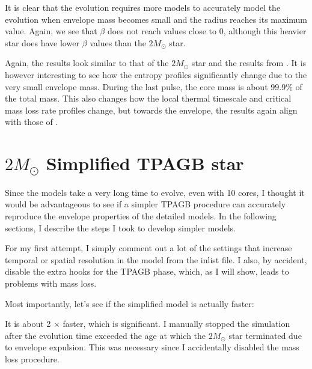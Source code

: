 \documentclass[a4paper,10pt]{article}
\begin{document}
\begin{figure}[ht]
    \centering
\end{figure}

It is clear that the evolution requires more models to accurately model the evolution when envelope mass becomes small and the radius reaches its maximum value. Again, we see that \(\beta \) does not reach values close to \(0\), although this heavier star does have lower \(\beta \) values than the \(2M_\odot \) star.
\begin{figure}[ht]
    \centering
\end{figure}

Again, the results look similar to that of the \(2M_\odot \) star and the results from \citet{temmink2022}. It is however interesting to see how the entropy profiles significantly change due to the very small envelope mass.
During the last pulse, the core mass is about \(99.9\%\) of the total mass.
This also changes how the local thermal timescale and critical mass loss rate profiles change, but towards the envelope, the results again align with those of \citet{temmink2022}.


\newpage
\section{\texorpdfstring{$2 M_\odot $}{2 solar mass} Simplified TPAGB star }

Since the models take a very long time to evolve, even with 10 cores, I thought it would be advantageous to see if a simpler TPAGB procedure can accurately reproduce the envelope properties of the detailed models. In the following sections, I describe the steps I took to develop simpler models.

For my first attempt, I simply comment out a lot of the settings that increase temporal or spatial resolution in the model from the inlist file. 
I also, by accident, disable the extra hooks for the TPAGB phase, which, as I will show, leads to problems with mass loss.

Most importantly, let's see if the simplified model is actually faster:

\begin{figure}[ht]
    \centering
\end{figure}

It is about 2 \(\times \) faster, which is significant.
I manually stopped the simulation after the evolution time exceeded the age at which the \(2M_\odot \) star terminated due to envelope expulsion.
This was necessary since I accidentally disabled the mass loss procedure.
\end{document}

